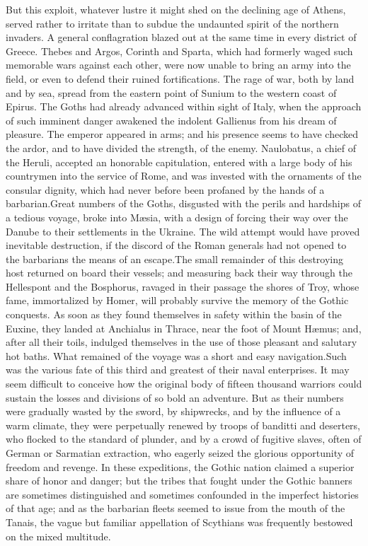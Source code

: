 But this exploit, whatever lustre it might shed on the declining
age of Athens, served rather to irritate than to subdue the
undaunted spirit of the northern invaders. A general
conflagration blazed out at the same time in every district of
Greece. Thebes and Argos, Corinth and Sparta, which had formerly
waged such memorable wars against each other, were now unable to
bring an army into the field, or even to defend their ruined
fortifications. The rage of war, both by land and by sea, spread
from the eastern point of Sunium to the western coast of Epirus.
The Goths had already advanced within sight of Italy, when the
approach of such imminent danger awakened the indolent Gallienus
from his dream of pleasure. The emperor appeared in arms; and his
presence seems to have checked the ardor, and to have divided the
strength, of the enemy. Naulobatus, a chief of the Heruli,
accepted an honorable capitulation, entered with a large body of
his countrymen into the service of Rome, and was invested with
the ornaments of the consular dignity, which had never before
been profaned by the hands of a barbarian.\footnotemark[124] Great numbers of
the Goths, disgusted with the perils and hardships of a tedious
voyage, broke into Mæsia, with a design of forcing their way over
the Danube to their settlements in the Ukraine. The wild attempt
would have proved inevitable destruction, if the discord of the
Roman generals had not opened to the barbarians the means of an
escape.\footnotemark[125] The small remainder of this destroying host returned
on board their vessels; and measuring back their way through the
Hellespont and the Bosphorus, ravaged in their passage the shores
of Troy, whose fame, immortalized by Homer, will probably survive
the memory of the Gothic conquests. As soon as they found
themselves in safety within the basin of the Euxine, they landed
at Anchialus in Thrace, near the foot of Mount Hæmus; and, after
all their toils, indulged themselves in the use of those pleasant
and salutary hot baths. What remained of the voyage was a short
and easy navigation.\footnotemark[126] Such was the various fate of this third
and greatest of their naval enterprises. It may seem difficult to
conceive how the original body of fifteen thousand warriors could
sustain the losses and divisions of so bold an adventure. But as
their numbers were gradually wasted by the sword, by shipwrecks,
and by the influence of a warm climate, they were perpetually
renewed by troops of banditti and deserters, who flocked to the
standard of plunder, and by a crowd of fugitive slaves, often of
German or Sarmatian extraction, who eagerly seized the glorious
opportunity of freedom and revenge. In these expeditions, the
Gothic nation claimed a superior share of honor and danger; but
the tribes that fought under the Gothic banners are sometimes
distinguished and sometimes confounded in the imperfect histories
of that age; and as the barbarian fleets seemed to issue from the
mouth of the Tanais, the vague but familiar appellation of
Scythians was frequently bestowed on the mixed multitude.\footnotemark[127]

